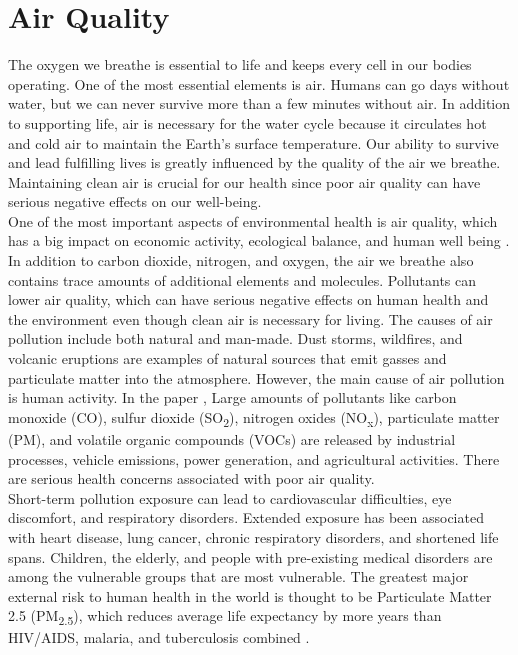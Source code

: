 \documentclass{book}
\numberwithin{equation}{section}
\numberwithin{figure}{section}
\begin{document}
\section{Air Quality}
\vspace{-5mm} %
The oxygen we breathe is essential to life and keeps every cell in our bodies operating. One of the most essential elements is air. Humans can go days without water, but we can never survive more than a few minutes without air. In addition to supporting life, air is necessary for the water cycle because it circulates hot and cold air to maintain the Earth's surface temperature.
Our ability to survive and lead fulfilling lives is greatly influenced by the quality of the air we breathe. Maintaining clean air is crucial for our health since poor air quality can have serious negative effects on our well-being.\\
One of the most important aspects of environmental health is air quality, which has a big impact on economic activity, ecological balance, and human well being \cite{Landrigan2018}. 
In addition to carbon dioxide, nitrogen, and oxygen, the air we breathe also contains trace amounts of additional elements and molecules. Pollutants can lower air quality, which can have serious negative effects on human health and the environment even though clean air is necessary for living.
The causes of air pollution include both natural and man-made. Dust storms, wildfires, and volcanic eruptions are examples of natural sources that emit gasses and particulate matter into the atmosphere. However, the main cause of air pollution is human activity. In the paper \citep{Guo2017}, Large amounts of pollutants like carbon monoxide (CO), sulfur dioxide (SO\textsubscript{2}), nitrogen oxides (NO\textsubscript{x}), particulate matter (PM), and volatile organic compounds (VOCs) are released by industrial processes, vehicle emissions, power generation, and agricultural activities. There are serious health concerns associated with poor air quality.\\
Short-term pollution exposure can lead to cardiovascular difficulties, eye discomfort, and respiratory disorders. Extended exposure has been associated with heart disease, lung cancer, chronic respiratory disorders, and shortened life spans. Children, the elderly, and people with pre-existing medical disorders are among the vulnerable groups that are most vulnerable. The greatest major external risk to human health in the world is thought to be Particulate Matter 2.5 (PM\textsubscript{2.5}), which reduces average life expectancy by more years than HIV/AIDS, malaria, and tuberculosis combined \citep{Burnett2018}.
\end{document}
